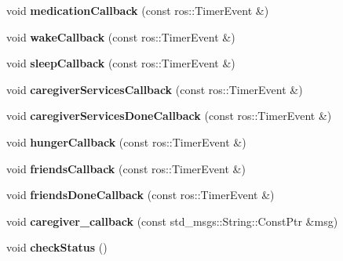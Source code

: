 \begin{DoxyCompactItemize}
\item 
\hypertarget{classResident_a385c83c3916a4d27d2a25ef8b370bec9}{void {\bfseries medication\-Callback} (const ros\-::\-Timer\-Event \&)}\label{classResident_a385c83c3916a4d27d2a25ef8b370bec9}

\item 
\hypertarget{classResident_a077344652ee8d61fb8af7b79f6694514}{void {\bfseries wake\-Callback} (const ros\-::\-Timer\-Event \&)}\label{classResident_a077344652ee8d61fb8af7b79f6694514}

\item 
\hypertarget{classResident_ac66d104fcc8722a2d5888171eecfbd69}{void {\bfseries sleep\-Callback} (const ros\-::\-Timer\-Event \&)}\label{classResident_ac66d104fcc8722a2d5888171eecfbd69}

\item 
\hypertarget{classResident_ac83ee402243f607d6026b9f2796f8ef1}{void {\bfseries caregiver\-Services\-Callback} (const ros\-::\-Timer\-Event \&)}\label{classResident_ac83ee402243f607d6026b9f2796f8ef1}

\item 
\hypertarget{classResident_a230654cb391de275302021decf9baa53}{void {\bfseries caregiver\-Services\-Done\-Callback} (const ros\-::\-Timer\-Event \&)}\label{classResident_a230654cb391de275302021decf9baa53}

\item 
\hypertarget{classResident_a22df12e23657cb49429d052d0168b957}{void {\bfseries hunger\-Callback} (const ros\-::\-Timer\-Event \&)}\label{classResident_a22df12e23657cb49429d052d0168b957}

\item 
\hypertarget{classResident_a03c057e1ce1f34456e71a35eb1b39c93}{void {\bfseries friends\-Callback} (const ros\-::\-Timer\-Event \&)}\label{classResident_a03c057e1ce1f34456e71a35eb1b39c93}

\item 
\hypertarget{classResident_aa1d45bfcd3798bcd907d605cf95e467d}{void {\bfseries friends\-Done\-Callback} (const ros\-::\-Timer\-Event \&)}\label{classResident_aa1d45bfcd3798bcd907d605cf95e467d}

\item 
\hypertarget{classResident_a142ba60229302edcf6bc69db55ee78ca}{void {\bfseries caregiver\-\_\-callback} (const std\-\_\-msgs\-::\-String\-::\-Const\-Ptr \&msg)}\label{classResident_a142ba60229302edcf6bc69db55ee78ca}

\item 
\hypertarget{classResident_a68e4438b39d8a0bacf1d85254587b029}{void {\bfseries check\-Status} ()}\label{classResident_a68e4438b39d8a0bacf1d85254587b029}

\end{DoxyCompactItemize}
